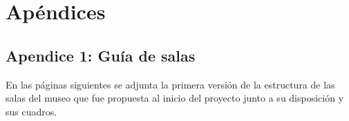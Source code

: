 \chapter{Apéndices}
\label{chap:apendices}

\section{Apendice 1: Guía de salas}
\label{anexo:guia-salas}

En las páginas siguientes se adjunta la primera versión de la estructura de las salas del museo que fue propuesta al inicio del proyecto junto a su disposición y sus cuadros.



